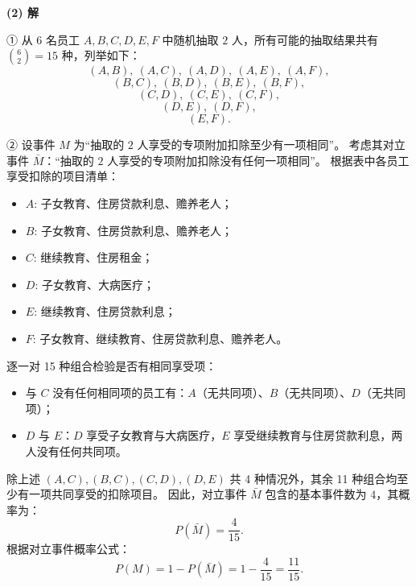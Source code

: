 \begin{answer}
\textbf{(2) 解}

① 从 $6$ 名员工 $A, B, C, D, E, F$ 中随机抽取 $2$ 人，所有可能的抽取结果共有 $\binom{6}{2} = 15$ 种，列举如下：
\nopagebreak[4]
\[(A, B),\ (A, C),\ (A, D),\ (A, E),\ (A, F),\]
\nopagebreak[4]
\[(B, C),\ (B, D),\ (B, E),\ (B, F),\]
\nopagebreak[4]
\[(C, D),\ (C, E),\ (C, F),\]
\nopagebreak[4]
\[(D, E),\ (D, F),\]
\nopagebreak[4]
\[(E, F).\]

② 设事件 $M$ 为“抽取的 $2$ 人享受的专项附加扣除至少有一项相同”。
考虑其对立事件 $\bar{M}$：“抽取的 $2$ 人享受的专项附加扣除没有任何一项相同”。
根据表中各员工享受扣除的项目清单：
\begin{itemize}
\item $A$: 子女教育、住房贷款利息、赡养老人；
\item $B$: 子女教育、住房贷款利息、赡养老人；
\item $C$: 继续教育、住房租金；
\item $D$: 子女教育、大病医疗；
\item $E$: 继续教育、住房贷款利息；
\item $F$: 子女教育、继续教育、住房贷款利息、赡养老人。
\end{itemize}
逐一对 15 种组合检验是否有相同享受项：
\begin{itemize}
\item 与 $C$ 没有任何相同项的员工有：$A$（无共同项）、$B$（无共同项）、$D$（无共同项）；
\item $D$ 与 $E$：$D$ 享受子女教育与大病医疗，$E$ 享受继续教育与住房贷款利息，两人没有任何共同项。
\end{itemize}
除上述 $(A, C), (B, C), (C, D), (D, E)$ 共 4 种情况外，其余 11 种组合均至少有一项共同享受的扣除项目。
因此，对立事件 $\bar{M}$ 包含的基本事件数为 $4$，其概率为：
\nopagebreak[4]
\[P(\bar{M}) = \frac{4}{15}.\]
根据对立事件概率公式：
\nopagebreak[4]
\[P(M) = 1 - P(\bar{M}) = 1 - \frac{4}{15} = \frac{11}{15}.\]



\end{answer}
